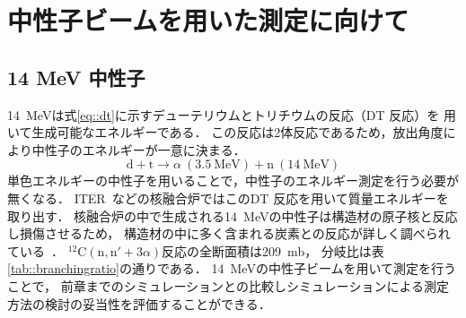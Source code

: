 \documentclass[../master]{subfiles}
\begin{document}
\chapter{中性子ビームを用いた測定に向けて}
\label{chap::experiment}
\section{14 MeV 中性子}
\SI{14}{\mega\electronvolt}は式\eqref{eq::dt}に示すデューテリウムとトリチウムの反応（DT 反応）を
用いて生成可能なエネルギーである．
この反応は2体反応であるため，放出角度により中性子のエネルギーが一意に決まる．%
\begin{equation}
  \mathrm{d} + \mathrm{t} \rightarrow \alpha\ (\SI{3.5}{\mega\electronvolt}) + \mathrm{n}\ (\SI{14}{\mega\electronvolt})
  \label{eq::dt}
\end{equation}
単色エネルギーの中性子を用いることで，中性子のエネルギー測定を行う必要が無くなる．
ITER~\cite{iter}などの核融合炉ではこのDT 反応を用いて質量エネルギーを取り出す．
核融合炉の中で生成される\SI{14}{\mega\electronvolt}の中性子は構造材の原子核と反応し損傷させるため，
構造材の中に多く含まれる炭素との反応が詳しく調べられている~\cite{takahashietal,kondoetal}．
${}^{12}\mathrm{C}(\mathrm{n},\mathrm{n}'+3\alpha)$反応の全断面積は\SI{209}{\milli\barn}，
分岐比は表\ref{tab::branchingratio}の通りである．
\SI{14}{\mega\electronvolt}の中性子ビームを用いて測定を行うことで，
前章までのシミュレーションとの比較しシミュレーションによる測定方法の検討の妥当性を評価することができる．
\end{document}
